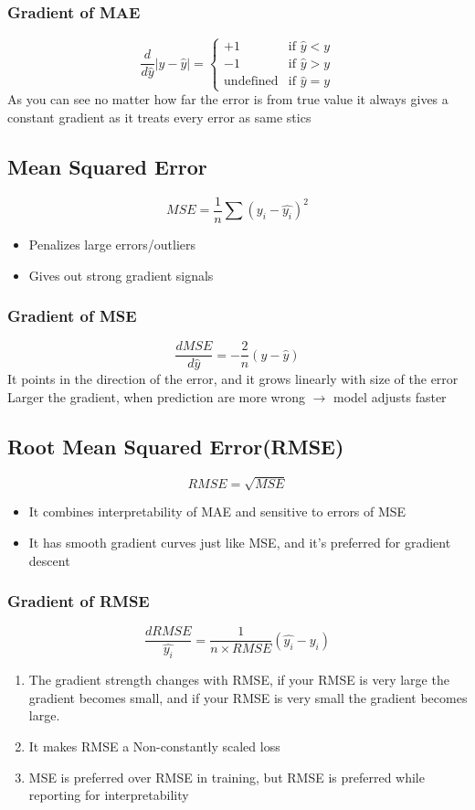 \documentclass[12pt]{extarticle}
\begin{document}
\subsubsection{Gradient of MAE} 
$$
\frac{d}{d\hat{y}}|y - \hat{y}| = 
\begin{cases} 
+1 & \text{if }  \hat{y} < y \\ 
-1 & \text{if }  \hat{y} > y \\ 
\text{undefined} & \text{if } \hat{y} = y 
\end{cases} 
$$
As you can see no matter how far the error is from true value it always gives a constant gradient as it treats every error as same
stics
\subsection{Mean Squared Error}
$$MSE = \frac{1}{n}\sum{(y_i - \hat{y_i})^2}$$ 
\begin{itemize}
    \item Penalizes large errors/outliers 
    \item Gives out strong gradient signals  
\end{itemize}
\subsubsection{Gradient of MSE}
$$\frac{d MSE}{d\hat{y}} = -\frac{2}{n}(y-\hat{y})$$
It points in the direction of the error, and it grows linearly with size of the error
Larger the gradient, when prediction are more wrong \(\longrightarrow\) model adjusts faster


\subsection{Root Mean Squared Error(RMSE)}  
$$RMSE = \sqrt{MSE}$$ 
\begin{itemize}
    \item It combines interpretability of MAE and sensitive to errors of MSE
    \item It has smooth gradient curves just like MSE, and it's preferred for gradient descent 
\end{itemize}

\subsubsection{Gradient of RMSE}
$$ \frac{d RMSE}{\hat{y_i}} = \frac{1}{n \times RMSE} (\hat{y_i}-y_i)$$
\begin{enumerate}
    \item The gradient strength changes with RMSE, if your RMSE is very large the gradient becomes small, and if your RMSE is very small the gradient becomes large.
    \item It makes RMSE a Non-constantly scaled loss
    \item MSE is preferred over RMSE in training, but RMSE is preferred while reporting for interpretability  
\end{enumerate}
\end{document}
